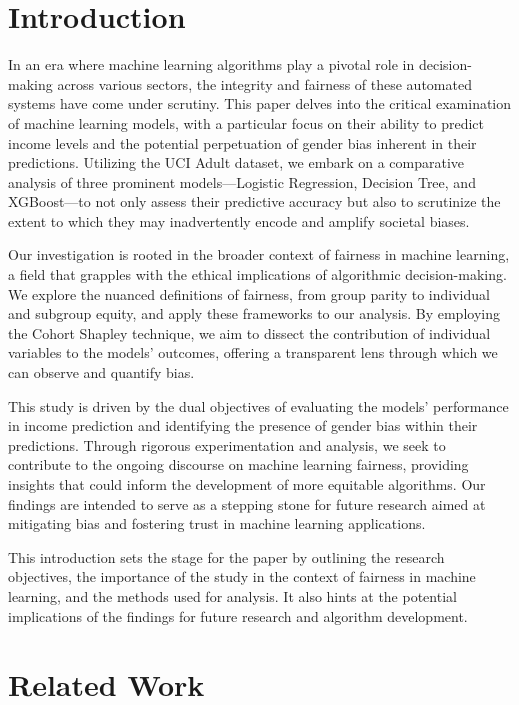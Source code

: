 \documentclass[conference]{IEEEtran}
\begin{document}
\section{Introduction}

In an era where machine learning algorithms play a pivotal role in decision-making across various sectors, the integrity and fairness of these automated systems have come under scrutiny. This paper delves into the critical examination of machine learning models, with a particular focus on their ability to predict income levels and the potential perpetuation of gender bias inherent in their predictions. Utilizing the UCI Adult dataset\cite{uciAdultDataset}, we embark on a comparative analysis of three prominent models—Logistic Regression, Decision Tree, and XGBoost—to not only assess their predictive accuracy but also to scrutinize the extent to which they may inadvertently encode and amplify societal biases.

Our investigation is rooted in the broader context of fairness in machine learning, a field that grapples with the ethical implications of algorithmic decision-making. We explore the nuanced definitions of fairness, from group parity to individual and subgroup equity, and apply these frameworks to our analysis. By employing the Cohort Shapley technique, we aim to dissect the contribution of individual variables to the models' outcomes, offering a transparent lens through which we can observe and quantify bias.

This study is driven by the dual objectives of evaluating the models' performance in income prediction and identifying the presence of gender bias within their predictions. Through rigorous experimentation and analysis, we seek to contribute to the ongoing discourse on machine learning fairness, providing insights that could inform the development of more equitable algorithms. Our findings are intended to serve as a stepping stone for future research aimed at mitigating bias and fostering trust in machine learning applications.

This introduction sets the stage for the paper by outlining the research objectives, the importance of the study in the context of fairness in machine learning, and the methods used for analysis. It also hints at the potential implications of the findings for future research and algorithm development.





\section{Related Work}
\end{document}
